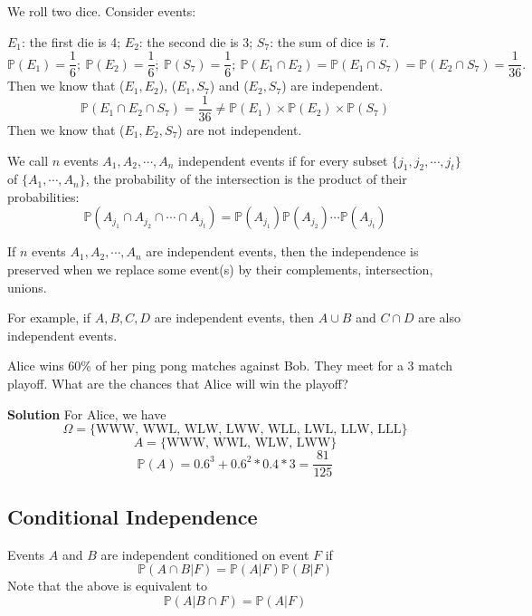 \begin{eg}
    We roll two dice. Consider events:
    
    \(E_1\): the first die is 4; \(E_2\): the second die is 3; \(S_7\): the sum of dice is 7. 
    \[
    \mathbb{P}(E_1) = \dfrac{1}{6};\ \mathbb{P}(E_2) = \dfrac{1}{6};\ \mathbb{P}(S_7) = \dfrac{1}{6};\ \mathbb{P}(E_1 \cap E_2) = \mathbb{P}(E_1 \cap S_7) = \mathbb{P}(E_2 \cap S_7) = \dfrac{1}{36}.
    \]
    Then we know that (\(E_1, E_2\)), (\(E_1, S_7\)) and (\(E_2, S_7\)) are independent. 
    \[
        \mathbb{P}(E_1 \cap E_2 \cap S_7) = \dfrac{1}{36} \neq \mathbb{P}(E_1) \times \mathbb{P}(E_2) \times \mathbb{P}(S_7)
    \]
    Then we know that (\(E_1, E_2, S_7\)) are not independent. 
\end{eg}

We call \(n\) events \(A_1, A_2, \cdots, A_n\) independent events if for every subset \(\{j_1, j_2, \cdots, j_t\}\) of \(\{A_1, \cdots, A_n\}\), the probability of the intersection is the product of their probabilities:
\[
    \mathbb{P}(A_{j_1} \cap A_{j_2} \cap \cdots \cap A_{j_t}) = \mathbb{P}(A_{j_1})\mathbb{P}(A_{j_2})\cdots\mathbb{P}(A_{j_t})
\]

If \(n\) events \(A_1, A_2, \cdots, A_n\) are independent events, then the independence is preserved when we replace some event(s) by their complements, intersection, unions.

For example, if \(A, B, C, D\) are independent events, then \(A \cup B\) and \(C \cap D\) are also independent events.

\begin{eg}
    Alice wins 60\% of her ping pong matches against Bob. They meet for a 3 match playoff. What are the chances that Alice will win the playoff? 

    \textbf{Solution}
    For Alice, we have
    \[
        \Omega = \{\text{WWW, WWL, WLW, LWW, WLL, LWL, LLW, LLL}\}
    \]
    \[
        A = \{\text{WWW, WWL, WLW, LWW}\}
    \]
    \[
        \mathbb{P}(A) = 0.6^3 + 0.6^2*0.4*3 = \frac{81}{125}
    \]
\end{eg}

\subsection{Conditional Independence}
\begin{definition}
    Events \(A\) and \(B\) are independent conditioned on event \(F\) if
    \[
        \mathbb{P}(A \cap B \vert F) = \mathbb{P}(A \vert F)\mathbb{P}(B \vert F)
    \]
    Note that the above is equivalent to
    \[
        \mathbb{P}(A \vert B \cap F) = \mathbb{P}(A \vert F)
    \]
\end{definition}

